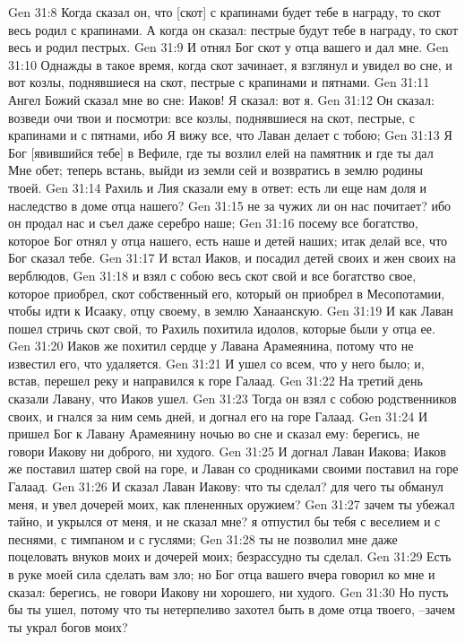 Gen 31:8  Когда сказал он, что [скот] с крапинами будет тебе в награду, то скот весь родил с крапинами. А когда он сказал: пестрые будут тебе в награду, то скот весь и родил пестрых.
Gen 31:9  И отнял Бог скот у отца вашего и дал мне.
Gen 31:10  Однажды в такое время, когда скот зачинает, я взглянул и увидел во сне, и вот козлы, поднявшиеся на скот, пестрые с крапинами и пятнами.
Gen 31:11  Ангел Божий сказал мне во сне: Иаков! Я сказал: вот я.
Gen 31:12  Он сказал: возведи очи твои и посмотри: все козлы, поднявшиеся на скот, пестрые, с крапинами и с пятнами, ибо Я вижу все, что Лаван делает с тобою;
Gen 31:13  Я Бог [явившийся тебе] в Вефиле, где ты возлил елей на памятник и где ты дал Мне обет; теперь встань, выйди из земли сей и возвратись в землю родины твоей.
Gen 31:14  Рахиль и Лия сказали ему в ответ: есть ли еще нам доля и наследство в доме отца нашего?
Gen 31:15  не за чужих ли он нас почитает? ибо он продал нас и съел даже серебро наше;
Gen 31:16  посему все богатство, которое Бог отнял у отца нашего, есть наше и детей наших; итак делай все, что Бог сказал тебе.
Gen 31:17  И встал Иаков, и посадил детей своих и жен своих на верблюдов,
Gen 31:18  и взял с собою весь скот свой и все богатство свое, которое приобрел, скот собственный его, который он приобрел в Месопотамии, чтобы идти к Исааку, отцу своему, в землю Ханаанскую.
Gen 31:19  И как Лаван пошел стричь скот свой, то Рахиль похитила идолов, которые были у отца ее.
Gen 31:20  Иаков же похитил сердце у Лавана Арамеянина, потому что не известил его, что удаляется.
Gen 31:21  И ушел со всем, что у него было; и, встав, перешел реку и направился к горе Галаад.
Gen 31:22  На третий день сказали Лавану, что Иаков ушел.
Gen 31:23  Тогда он взял с собою родственников своих, и гнался за ним семь дней, и догнал его на горе Галаад.
Gen 31:24  И пришел Бог к Лавану Арамеянину ночью во сне и сказал ему: берегись, не говори Иакову ни доброго, ни худого.
Gen 31:25  И догнал Лаван Иакова; Иаков же поставил шатер свой на горе, и Лаван со сродниками своими поставил на горе Галаад.
Gen 31:26  И сказал Лаван Иакову: что ты сделал? для чего ты обманул меня, и увел дочерей моих, как плененных оружием?
Gen 31:27  зачем ты убежал тайно, и укрылся от меня, и не сказал мне? я отпустил бы тебя с веселием и с песнями, с тимпаном и с гуслями;
Gen 31:28  ты не позволил мне даже поцеловать внуков моих и дочерей моих; безрассудно ты сделал.
Gen 31:29  Есть в руке моей сила сделать вам зло; но Бог отца вашего вчера говорил ко мне и сказал: берегись, не говори Иакову ни хорошего, ни худого.
Gen 31:30  Но пусть бы ты ушел, потому что ты нетерпеливо захотел быть в доме отца твоего, --зачем ты украл богов моих?
